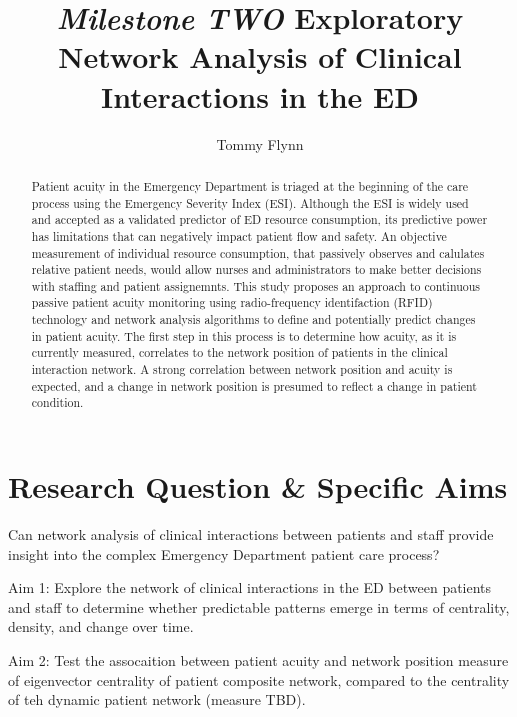 \documentclass[]{elsarticle} %
\begin{document}
\begin{frontmatter}

  \title{\emph{Milestone TWO} Exploratory Network Analysis of Clinical
Interactions in the ED}
    \author[Emory University]{Tommy Flynn}
      \address[Emory University]{Find the GitHub repository at
\url{https://github.com/tommyflynn/Project-Milestone-1.git}}
  
  \begin{abstract}
  Patient acuity in the Emergency Department is triaged at the beginning
  of the care process using the Emergency Severity Index (ESI). Although
  the ESI is widely used and accepted as a validated predictor of ED
  resource consumption, its predictive power has limitations that can
  negatively impact patient flow and safety. An objective measurement of
  individual resource consumption, that passively observes and calulates
  relative patient needs, would allow nurses and administrators to make
  better decisions with staffing and patient assignemnts. This study
  proposes an approach to continuous passive patient acuity monitoring
  using radio-frequency identifaction (RFID) technology and network
  analysis algorithms to define and potentially predict changes in patient
  acuity. The first step in this process is to determine how acuity, as it
  is currently measured, correlates to the network position of patients in
  the clinical interaction network. A strong correlation between network
  position and acuity is expected, and a change in network position is
  presumed to reflect a change in patient condition.
  \end{abstract}
  
 \end{frontmatter}

\section{Research Question \& Specific
Aims}\label{research-question-specific-aims}

Can network analysis of clinical interactions between patients and staff
provide insight into the complex Emergency Department patient care
process?

Aim 1: Explore the network of clinical interactions in the ED between
patients and staff to determine whether predictable patterns emerge in
terms of centrality, density, and change over time.

Aim 2: Test the assocaition between patient acuity and network position
measure of eigenvector centrality of patient composite network, compared
to the centrality of teh dynamic patient network (measure TBD).
\end{document}
